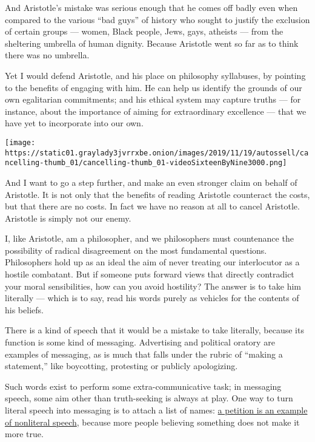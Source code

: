 And Aristotle's mistake was serious enough that he comes off badly even
when compared to the various ``bad guys'' of history who sought to
justify the exclusion of certain groups --- women, Black people, Jews,
gays, atheists --- from the sheltering umbrella of human dignity.
Because Aristotle went so far as to think there was no umbrella.

Yet I would defend Aristotle, and his place on philosophy syllabuses, by
pointing to the benefits of engaging with him. He can help us identify
the grounds of our own egalitarian commitments; and his ethical system
may capture truths --- for instance, about the importance of aiming for
extraordinary excellence --- that we have yet to incorporate into our
own.

\texttt{[image: https://static01.graylady3jvrrxbe.onion/images/2019/11/19/autossell/cancelling-thumb\_01/cancelling-thumb\_01-videoSixteenByNine3000.png]}

And I want to go a step further, and make an even stronger claim on
behalf of Aristotle. It is not only that the benefits of reading
Aristotle counteract the costs, but that there are no costs. In fact we
have no reason at all to cancel Aristotle. Aristotle is simply not our
enemy.

I, like Aristotle, am a philosopher, and we philosophers must
countenance the possibility of radical disagreement on the most
fundamental questions. Philosophers hold up as an ideal the aim of never
treating our interlocutor as a hostile combatant. But if someone puts
forward views that directly contradict your moral sensibilities, how can
you avoid hostility? The answer is to take him literally --- which is to
say, read his words purely as vehicles for the contents of his beliefs.

There is a kind of speech that it would be a mistake to take literally,
because its function is some kind of messaging. Advertising and
political oratory are examples of messaging, as is much that falls under
the rubric of ``making a statement,'' like boycotting, protesting or
publicly apologizing.

Such words exist to perform some extra-communicative task; in messaging
speech, some aim other than truth-seeking is always at play. One way to
turn literal speech into messaging is to attach a list of names:
\href{https://www.nytimes3xbfgragh.onion/2019/08/13/opinion/philosophers-petitions.html}{a
petition is an example of nonliteral speech}, because more people
believing something does not make it more true.

